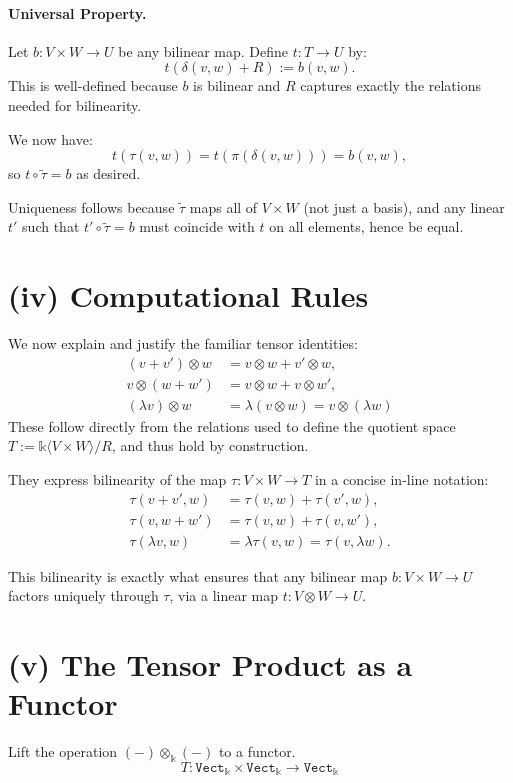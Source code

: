 \documentclass[10pt]{tufte-handout}
\begin{document}
\paragraph{Universal Property.} Let $b : V \times W \to U$ be any bilinear map. Define $t : T \to U$ by:
\[ t(\delta(v,w) + R) := b(v,w). \]
This is well-defined because $b$ is bilinear and $R$ captures exactly the relations needed for bilinearity. 

We now have:
\[
   t(\tau(v,w)) = t(\pi(\delta(v,w))) = b(v,w),
\]
so $t \circ \widetilde{\tau} = b$ as desired.

Uniqueness follows because $\widetilde{\tau}$ maps all of $V \times W$ (not just a basis), and any linear $t'$ such that $t' \circ \widetilde{\tau} = b$ must coincide with $t$ on all elements, hence be equal.


\section{(iv) Computational Rules}
We now explain and justify the familiar tensor identities:
\begin{align*}
(v + v') \otimes w &= v \otimes w + v' \otimes w, \\
v \otimes (w + w') &= v \otimes w + v \otimes w', \\
(\lambda v) \otimes w &= \lambda(v \otimes w) = v \otimes (\lambda w)
\end{align*}
These follow directly from the relations used to define the quotient space $T := \mathds{k}\langle V \times W \rangle / R$, and thus hold by construction.

They express bilinearity of the map $\tau : V \times W \to T$ in a concise in-line notation:
\begin{align*}
\tau(v + v', w) &= \tau(v, w) + \tau(v', w), \\
\tau(v, w + w') &= \tau(v, w) + \tau(v, w'), \\
\tau(\lambda v, w) &= \lambda \tau(v, w) = \tau(v, \lambda w).
\end{align*}


This bilinearity is exactly what ensures that any bilinear map $b : V \times W \to U$ factors uniquely through $\tau$, via a linear map $t : V \otimes W \to U$.



\section{(v) The Tensor Product as a Functor}
Lift the operation $(-) \otimes_{\mathds{k}} (-)$ to a functor.
\[
T : \texttt{Vect}_{\mathds{k}} \times \texttt{Vect}_{\mathds{k}} \to \texttt{Vect}_{\mathds{k}}
\]
\end{document}
